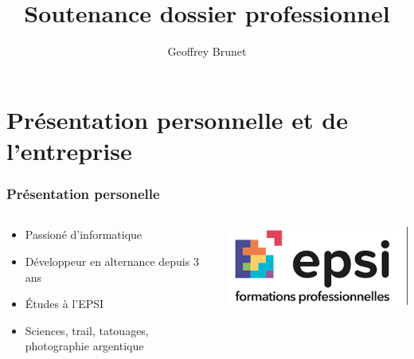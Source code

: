 \documentclass[aspectratio=169]{beamer}
\title{Soutenance dossier professionnel}
\author{Geoffrey Brunet}
\institute{EPSI Auxerre | Quartz-Insight}
\begin{document}
\maketitle


\section{Présentation personnelle et de l'entreprise}

\begin{frame}
    \frametitle{Présentation personelle}
    \begin{columns}
        \begin{column}{0.5\textwidth}
            \begin{itemize}
                \item Passioné d'informatique
                \item Développeur en alternance
                  depuis 3 ans
                \item Études à l'EPSI
                \item Sciences, trail, tatouages,
                  photographie argentique
            \end{itemize}
        \end{column}
        \begin{column}{0.5\textwidth}
            \includegraphics[height=0.20\textheight]{Imgs/logo-epsi-v2.png}
        \end{column}
    \end{columns}
\end{frame}
\end{document}
